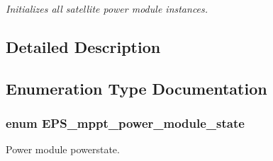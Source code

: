 \begin{DoxyCompactItemize}
\begin{DoxyCompactList}\small\item\em Initializes all satellite power module instances. \end{DoxyCompactList}\end{DoxyCompactItemize}


\subsection{Detailed Description}


\subsection{Enumeration Type Documentation}
\hypertarget{group__eps__power__module_gadd75354311e873b06e0f85b643c5cea2}{
\subsubsection[{E\-P\-S\-\_\-mppt\-\_\-power\-\_\-module\-\_\-state}]{\setlength{\rightskip}{0pt plus 5cm}enum {\bf E\-P\-S\-\_\-mppt\-\_\-power\-\_\-module\-\_\-state}}}\label{group__eps__power__module_gadd75354311e873b06e0f85b643c5cea2}


Power module powerstate. 

